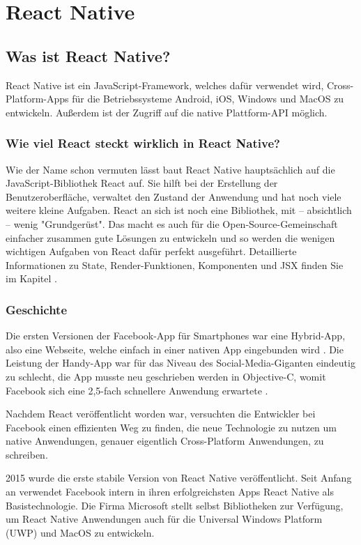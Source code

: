 \section{React Native}
\label{reactnative}

\subsection{Was ist React Native?}
React Native ist ein JavaScript-Framework, welches dafür verwendet wird, Cross-Platform-Apps für
die Betriebssysteme Android, iOS, Windows und MacOS zu entwickeln. Außerdem ist der Zugriff auf die
native Plattform-API möglich.

\subsubsection{Wie viel React steckt wirklich in React Native?}
Wie der Name schon vermuten lässt baut React Native hauptsächlich auf die JavaScript-Bibliothek
React auf. Sie hilft bei der Erstellung der Benutzeroberfläche, verwaltet den Zustand der
Anwendung und hat noch viele weitere kleine Aufgaben. React an sich ist noch eine Bibliothek,
mit -- absichtlich -- wenig "Grundgerüst". Das macht es auch für die Open-Source-Gemeinschaft
einfacher zusammen gute Lösungen zu entwickeln und so werden die wenigen wichtigen Aufgaben von
React dafür perfekt ausgeführt.
Detaillierte Informationen zu State, Render-Funktionen, Komponenten und JSX finden Sie im Kapitel
.

\subsubsection{Geschichte}
Die ersten Versionen der Facebook-App für Smartphones war eine Hybrid-App, also eine Webseite,
welche einfach in einer nativen App eingebunden wird \cite{reactNativeHistory}. Die Leistung der
Handy-App war für das Niveau des Social-Media-Giganten eindeutig zu schlecht, die App musste neu
geschrieben werden in Objective-C, womit Facebook sich eine 2,5-fach schnellere Anwendung erwartete
\cite{facebookNewIosApp}.

Nachdem React veröffentlicht worden war, versuchten die Entwickler bei Facebook einen effizienten
Weg zu finden, die neue Technologie zu nutzen um native Anwendungen, genauer eigentlich
Cross-Platform Anwendungen, zu schreiben.

2015 wurde die erste stabile Version von React Native veröffentlicht. Seit Anfang an verwendet
Facebook intern in ihren erfolgreichsten Apps React Native als Basistechnologie. Die Firma Microsoft
stellt selbst Bibliotheken zur Verfügung, um React Native Anwendungen auch für die Universal Windows
Platform (UWP) und MacOS zu entwickeln.

